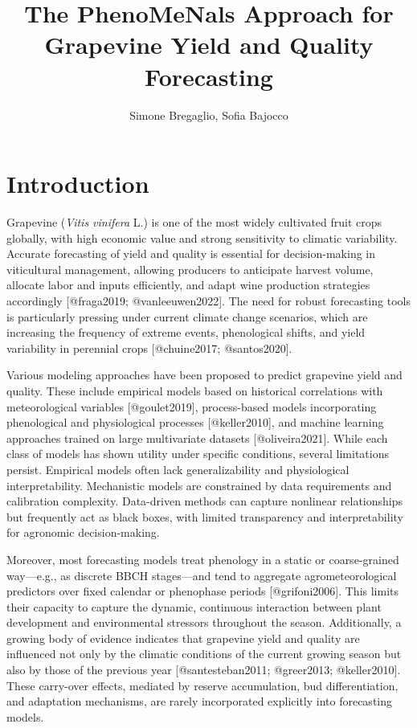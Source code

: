 \documentclass[
  letterpaper,
  DIV=11,
  numbers=noendperiod]{scrartcl}
\title{The PhenoMeNals Approach for Grapevine Yield and Quality
Forecasting}
\author{Simone Bregaglio, Sofia Bajocco}
\date{}
\renewcommand*\contentsname{Table of contents}
\newcommand\contentsname{Table of contents}
\begin{document}
\maketitle

\renewcommand*\contentsname{Table of contents}
{
\hypersetup{linkcolor=}
\setcounter{tocdepth}{3}
\tableofcontents
}

\section{Introduction}\label{introduction}

Grapevine (\emph{Vitis vinifera} L.) is one of the most widely
cultivated fruit crops globally, with high economic value and strong
sensitivity to climatic variability. Accurate forecasting of yield and
quality is essential for decision-making in viticultural management,
allowing producers to anticipate harvest volume, allocate labor and
inputs efficiently, and adapt wine production strategies accordingly
{[}@fraga2019; @vanleeuwen2022{]}. The need for robust forecasting tools
is particularly pressing under current climate change scenarios, which
are increasing the frequency of extreme events, phenological shifts, and
yield variability in perennial crops {[}@chuine2017; @santos2020{]}.

Various modeling approaches have been proposed to predict grapevine
yield and quality. These include empirical models based on historical
correlations with meteorological variables {[}@goulet2019{]},
process-based models incorporating phenological and physiological
processes {[}@keller2010{]}, and machine learning approaches trained on
large multivariate datasets {[}@oliveira2021{]}. While each class of
models has shown utility under specific conditions, several limitations
persist. Empirical models often lack generalizability and physiological
interpretability. Mechanistic models are constrained by data
requirements and calibration complexity. Data-driven methods can capture
nonlinear relationships but frequently act as black boxes, with limited
transparency and interpretability for agronomic decision-making.

Moreover, most forecasting models treat phenology in a static or
coarse-grained way---e.g., as discrete BBCH stages---and tend to
aggregate agrometeorological predictors over fixed calendar or
phenophase periods {[}@grifoni2006{]}. This limits their capacity to
capture the dynamic, continuous interaction between plant development
and environmental stressors throughout the season. Additionally, a
growing body of evidence indicates that grapevine yield and quality are
influenced not only by the climatic conditions of the current growing
season but also by those of the previous year {[}@santesteban2011;
@greer2013; @keller2010{]}. These carry-over effects, mediated by
reserve accumulation, bud differentiation, and adaptation mechanisms,
are rarely incorporated explicitly into forecasting models.
\end{document}

